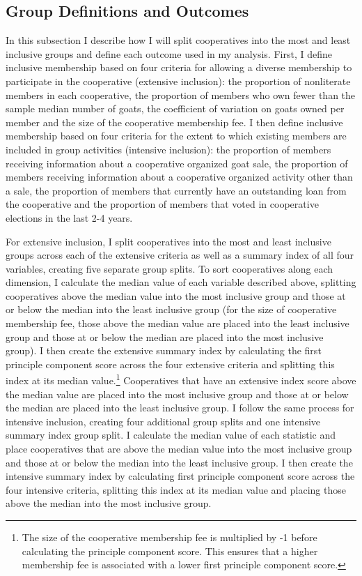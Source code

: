 \documentclass[11pt]{article}
\begin{document}
\subsection{Group Definitions and Outcomes}

In this subsection I describe how I will split cooperatives into the most and least inclusive groups and define each outcome used in my analysis. First, I define inclusive membership based on four criteria for allowing a diverse membership to participate in the cooperative (extensive inclusion): the proportion of nonliterate members in each cooperative, the proportion of members who own fewer than the sample median number of goats, the coefficient of variation on goats owned per member and the size of the cooperative membership fee. I then define inclusive membership based on four criteria for the extent to which existing members are included in group activities (intensive inclusion): the proportion of members receiving information about a cooperative organized goat sale, the proportion of members receiving information about a cooperative organized activity other than a sale, the proportion of members that currently have an outstanding loan from the cooperative and the proportion of members that voted in cooperative elections in the last 2-4 years.

For extensive inclusion, I split cooperatives into the most and least inclusive groups across each of the extensive criteria as well as a summary index of all four variables, creating five separate group splits. To sort cooperatives along each dimension, I calculate the median value of each variable described above, splitting cooperatives above the median value into the most inclusive group and those at or below the median into the least inclusive group (for the size of cooperative membership fee, those above the median value are placed into the least inclusive group and those at or below the median are placed into the most inclusive group). I then create the extensive summary index by calculating the first principle component score across the four extensive criteria and splitting this index at its median value.\footnote{The size of the cooperative membership fee is multiplied by -1 before calculating the principle component score. This ensures that a higher membership fee is associated with a lower first principle component score.} Cooperatives that have an extensive index score above the median value are placed into the most inclusive group and those at or below the median are placed into the least inclusive group. I follow the same process for intensive inclusion, creating four additional group splits and one intensive summary index group split. I calculate the median value of each statistic and place cooperatives that are above the median value into the most inclusive group and those at or below the median into the least inclusive group. I then create the intensive summary index by calculating first principle component score across the four intensive criteria, splitting this index at its median value and placing those above the median into the most inclusive group.
\end{document}

